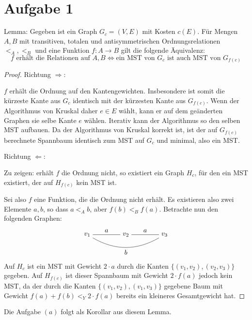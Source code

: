 \documentclass[a4paper]{article}
\begin{document}
\section{Aufgabe 1}
Lemma: Gegeben ist ein Graph $G_c = (V, E)$ mit Kosten $c(E)$.
Für Mengen $A, B$ mit transitiven, totalen und antisymmetrischen Ordnungsrelationen
$<_A, <_B$ und eine Funktion $f:
A \rightarrow B$ gilt die folgende Äquivalenz:
\[
	\text{$f$ erhält die Relationen auf $A, B$} \Leftrightarrow \text{ein
	MST von $G_c$ ist auch MST von $G_{f(c)}$}
\]

\begin{proof}
Richtung $\Rightarrow$:

$f$ erhält die Ordnung auf den Kantengewichten. Insbesondere ist somit die
kürzeste Kante aus $G_c$ identisch mit der kürzesten Kante aus $G_{f(c)}$. Wenn
der Algorithmus von Kruskal daher $e \in E$ wählt, kann er auf dem
geänderten Graphen sie selbe Kante $e$ wählen. Iterativ kann der Algorithmus
so den selben MST aufbauen. Da der Algorithmus von Kruskal korrekt ist, ist
der auf $G_{f(c)}$ berechnete Spannbaum identisch zum MST auf $G_c$ und
minimal, also ein MST.

Richtung $\Leftarrow$:

Zu zeigen: erhält $f$ die Ordnung nicht, so existiert ein Graph $H_c$, für
den ein MST existiert, der auf $H_{f(c)}$ kein MST ist.

Sei also $f$ eine Funktion, die die Ordnung nicht erhält. Es existieren also
zwei Elemente $a, b$, so dass $a <_A b$, aber $f(b) <_B f(a)$.
Betrachte nun den folgenden Graphen:
\[
\begin{tikzpicture}[auto, node distance=2cm]
	\node (v1) {$v_1$};
	\node (v2) [right of=v1] {$v_2$};
	\node (v3) [right of=v2] {$v_3$};
	\path
		(v1) edge node {$a$} (v2)
		(v2) edge node {$a$} (v3)
		(v1) edge [bend right] node [anchor=base, below] {$b$} (v3)
	;
\end{tikzpicture}
\]
Auf $H_c$ ist ein MST mit Gewicht $2 \cdot a$ durch die Kanten $\{ (v_1, v_2), (v_2, v_3) \}$ gegeben.
Auf $H_{f(c)}$ ist dieser Spannbaum mit Gewicht $2 \cdot f(a)$ jedoch kein MST, da der durch die Kanten $\{ (v_1,
v_2), (v_1, v_3) \}$ gegebene Baum mit Gewicht $f(a) + f(b) <_Y 2 \cdot
f(a)$ bereits ein kleineres Gesamtgewicht hat.
\end{proof}

Die Aufgabe $(a)$ folgt als Korollar aus diesem Lemma.

\subsection{}
\end{document}
